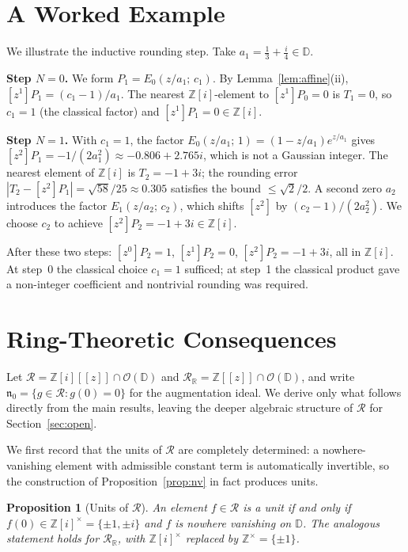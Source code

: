 \documentclass{amsart}
\newtheorem{proposition}[theorem]{Proposition}
\theoremstyle{definition}
\newcommand{\D}{\mathbb{D}}
\newcommand{\Z}{\mathbb{Z}}
\newcommand{\Zi}{\mathbb{Z}[i]}
\newcommand{\abs}[1]{\left|#1\right|}
\newcommand{\OD}{\mathcal{O}(\D)}
\newcommand{\mR}{\mathcal{R}}
\newcommand{\mRR}{\mathcal{R}_{\mathbb{R}}}
\begin{document}
\section{A Worked Example}
\label{sec:example}

We illustrate the inductive rounding step.  Take $a_1 = \frac{1}{3} +
\frac{i}{4} \in \D$.

\medskip\noindent\textbf{Step $N=0$.}  We form $P_1 = E_0(z/a_1;\,c_1)$.
By Lemma~\ref{lem:affine}(ii), $[z^1]P_1 = (c_1-1)/a_1$.  The nearest
$\Zi$-element to $[z^1]P_0 = 0$ is $T_1 = 0$, so $c_1 = 1$ (the classical
factor) and $[z^1]P_1 = 0 \in \Zi$.

\medskip\noindent\textbf{Step $N=1$.}  With $c_1 = 1$, the factor
$E_0(z/a_1;\,1) = (1-z/a_1)e^{z/a_1}$ gives $[z^2]P_1 = -1/(2a_1^2)
\approx -0.806 + 2.765i$, which is not a Gaussian integer.
The nearest element of $\Zi$ is $T_2 = -1+3i$; the rounding error
$\abs{T_2 - [z^2]P_1} = \sqrt{58}/25 \approx 0.305$ satisfies the
bound $\leq \sqrt{2}/2$.  A second zero $a_2$ introduces the factor
$E_1(z/a_2;\,c_2)$, which shifts $[z^2]$ by $(c_2-1)/(2a_2^2)$.
We choose $c_2$ to achieve $[z^2]P_2 = -1+3i \in \Zi$.

After these two steps: $[z^0]P_2 = 1$, $[z^1]P_2 = 0$,
$[z^2]P_2 = -1+3i$, all in $\Zi$.  At step~0 the classical choice
$c_1 = 1$ sufficed; at step~1 the classical product gave a non-integer
coefficient and nontrivial rounding was required.

\section{Ring-Theoretic Consequences}
\label{sec:algebra}

Let $\mR = \Zi[[z]] \cap \OD$ and $\mRR = \Z[[z]] \cap \OD$, and write
$\mathfrak{n}_0 = \{g \in \mR : g(0) = 0\}$ for the augmentation ideal.
We derive only what follows directly from the main results, leaving the
deeper algebraic structure of $\mR$ for Section~\ref{sec:open}.

We first record that the units of $\mR$ are completely determined: a
nowhere-vanishing element with admissible constant term is automatically
invertible, so the construction of Proposition~\ref{prop:nv} in fact
produces units.

\begin{proposition}[Units of $\mR$]
\label{prop:units}
An element $f \in \mR$ is a unit if and only if $f(0) \in \Zi^\times =
\{\pm 1, \pm i\}$ and $f$ is nowhere vanishing on $\D$.  The analogous
statement holds for $\mRR$, with $\Zi^\times$ replaced by
$\Z^\times = \{\pm 1\}$.
\end{proposition}
\end{document}
